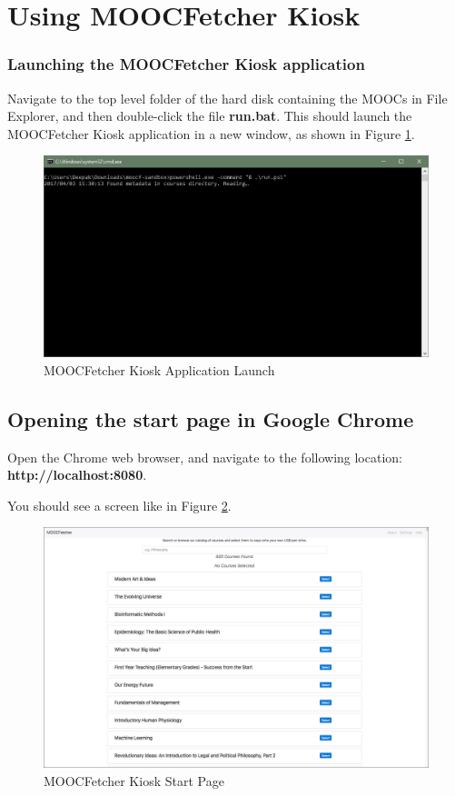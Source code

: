 \documentclass[]{article}
\begin{document}
\section{Using MOOCFetcher Kiosk}\label{using-moocfetcher-kiosk}

\subsubsection{Launching the MOOCFetcher Kiosk
application}\label{launching-the-moocfetcher-kiosk-application}

Navigate to the top level folder of the hard disk containing the MOOCs
in File Explorer, and then double-click the file \textbf{run.bat}. This
should launch the MOOCFetcher Kiosk application in a new window, as
shown in Figure \ref{launch}.

\begin{figure}
\centering
\includegraphics{launch.jpg}
\caption{MOOCFetcher Kiosk Application Launch \label{launch}}
\end{figure}

\subsection{Opening the start page in Google
Chrome}\label{opening-the-start-page-in-google-chrome}

Open the Chrome web browser, and navigate to the following location:
\textbf{http://localhost:8080}.

You should see a screen like in Figure \ref{startpage}.

\begin{figure}
\centering
\includegraphics{step1.jpg}
\caption{MOOCFetcher Kiosk Start Page \label{startpage}}
\end{figure}
\end{document}
